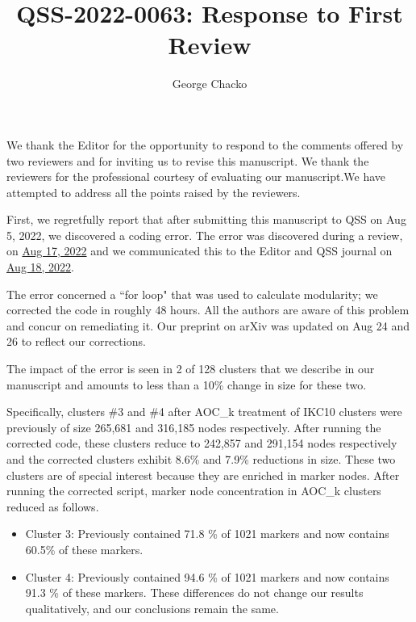 \documentclass[11pt, oneside]{article}   	%
\title{QSS-2022-0063: Response to First Review}
\author{George Chacko}
\begin{document}
\maketitle
\section*{}

We thank the Editor for the opportunity to respond to the comments offered by two reviewers and for inviting us to revise this manuscript. We thank the reviewers for the professional courtesy of evaluating our manuscript.We have attempted to address all the points raised by the reviewers.

First, we regretfully report that after submitting this manuscript to QSS on Aug 5, 2022, we discovered a coding error. The error was discovered during a review,
on \underline{Aug 17, 2022}  and we communicated this to the Editor and QSS journal on \underline{Aug 18, 2022}. 

The error concerned a ``for loop" that was used to calculate modularity; we corrected the code in roughly 48 hours. All the authors are aware of this problem and 
concur on remediating it. Our preprint on arXiv was updated on Aug 24 and 26 to reflect our corrections. 

The impact of the error is seen in 2 of 128 clusters  that we describe in our manuscript and amounts to less than a 10\% change in size for these two.
 
Specifically, clusters \#3 and \#4 after AOC\_k treatment of IKC10 clusters were previously of size 265,681 and 316,185 nodes respectively. After running the corrected code, these
clusters reduce to 242,857 and 291,154 nodes respectively and the corrected clusters exhibit 8.6\% and 7.9\% reductions in size. These two clusters are of special interest because 
they are  enriched in marker nodes. After running the corrected script, marker node concentration in AOC\_k clusters reduced as follows. 

\begin{itemize}
\item Cluster 3: Previously contained 71.8 \% of 1021 markers and now contains 60.5\% of these markers.
\item Cluster 4: Previously contained 94.6 \% of 1021 markers and now contains 91.3 \% of these markers. These differences do not change our results qualitatively, and our conclusions remain the same. 
\end{itemize}
\end{document}
